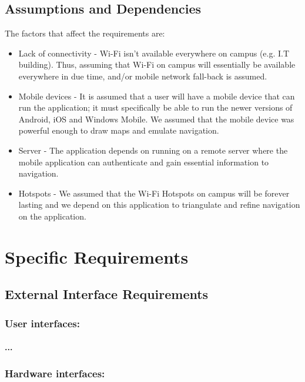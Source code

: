 \documentclass[runningheads,a4paper]{article}
\begin{document}
\subsection{Assumptions and Dependencies}
The factors that affect the requirements are:
\begin{itemize}
	 
		\item Lack of connectivity -  Wi-Fi isn't available everywhere on campus (e.g. I.T building). Thus, assuming that Wi-Fi on campus will essentially be available everywhere in due time, and/or mobile network fall-back is assumed.
		
		\item Mobile devices - It is assumed that a user will have a mobile device that can run the application; it must specifically be able to run the newer versions of Android, iOS and Windows Mobile. We assumed that the mobile device was powerful enough to draw maps and emulate navigation.
		\item Server - The application depends on running on a remote server where the mobile application can authenticate and gain essential information to navigation.
		
		\item Hotspots - We assumed that the Wi-Fi Hotspots on campus will be forever lasting and we depend on this application to triangulate and refine navigation on the application.
	 
\end{itemize}
 


\section{Specific Requirements}

\subsection{External Interface Requirements}

\subsubsection{User interfaces:}
\paragraph{...}
\subsubsection{Hardware interfaces:}
\end{document}
